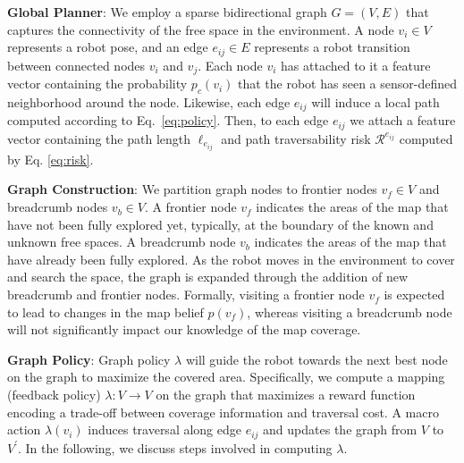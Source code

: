 \documentclass[letterpaper, 10pt, conference]{ieeeconf}      %
\newcommand{\ph}[1]{{\textbf{#1}:}} %
\newcommand{\rev}[1]{{\color{blue}#1}} %
\begin{document}
\ph{Global Planner} We employ a sparse bidirectional graph $G = (V, E)$ that captures the connectivity of the free space in the environment. A node $v_i \in V$ represents a robot pose, and an edge $e_{ij} \in E$ represents a robot transition between connected nodes $v_i$ and $v_j$. Each node $v_i$ has attached to it a feature vector containing the probability $p_{c}(v_i)$ that the robot has seen a sensor-defined neighborhood around the node. Likewise, each edge $e_{ij}$ will induce a local path computed according to Eq.~\ref{eq:policy}. Then, to each edge $e_{ij}$ we attach a feature vector containing the path length $\ell_{e_{ij}}$ and path traversability risk $\mathcal{R}^{e_{ij}}$ computed by Eq. \ref{eq:risk}.


\ph{Graph Construction} 
We partition graph nodes to frontier nodes $v_f \in V$ and breadcrumb nodes $v_b \in V$. A frontier node $v_f$ indicates the areas of the map that have not been fully explored yet, typically, at the boundary of the known and unknown free spaces. A breadcrumb node $v_b$ indicates the areas of the map that have already been fully explored. As the robot moves in the environment to cover and search the space, the graph is expanded through the addition of new breadcrumb and frontier nodes. \rev{Formally}, visiting a frontier node $v_f$ is expected to lead to changes in the map belief $p(v_f)$, whereas visiting a breadcrumb node will not significantly impact our knowledge of the map coverage.

\ph{Graph Policy}
Graph policy $\lambda$ will guide the robot towards the next best node on the graph to maximize the covered area. Specifically, we compute a mapping (feedback policy) $\lambda:V\rightarrow V$ on the graph that maximizes a reward function encoding a trade-off between coverage information and traversal cost. A macro action $\lambda(v_i)$ induces traversal along edge $e_{ij}$ and updates the graph from $V$ to $V^\prime$. In the following, we discuss steps involved in computing $\lambda$.
\end{document}
